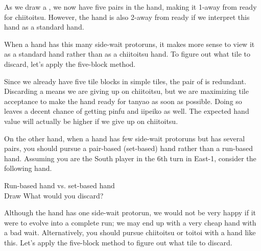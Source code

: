 \bigskip
\noindent As we draw a {\large{}}, we now have five pairs in the hand, making it 1-away from ready for {\jap chiitoitsu}. However, the hand is also 2-away from ready if we interpret this hand as a standard hand. 

\bigskip
When a hand has this many side-wait protoruns, it makes more sense to view it as a standard hand rather than as a {\jap chiitoitsu} hand. To figure out what tile to discard, let's apply the five-block method. 

\emj
Since we already have five tile blocks in simple tiles, the pair of {\large\bei} is redundant. Discarding a {\large\bei} means we are giving up on {\jap chiitoitsu}, but we are maximizing tile acceptance to make the hand ready for {\jap tanyao} as soon as possible. Doing so leaves a decent chance of getting {\jap pinfu} and {\jap iipeiko} as well. The expected hand value will actually be higher if we give up on {\jap chiitoitsu}.

\bigskip
On the other hand, when a hand has few side-wait protoruns but has several pairs, you should pursue a pair-based (set-based) hand rather than a run-based hand. Assuming you are the South player in the 6th turn in East-1, consider the following hand. 

\bigskip
\begin{itembox}[r]{Run-based hand vs. set-based hand}
\bp
{}\dong\nan\bai~\bai\\
\hspace{290pt}\footnotesize{Draw}
\ep
\vspace{-17pt}What would you discard? \vspace{-5pt}
\end{itembox}

\bigskip
\noindent Although the hand has one side-wait protorun, we would not be very happy if it were to evolve into a complete run; we may end up with a very cheap hand with a bad wait. Alternatively, you should pursue {\jap chiitoitsu} or {\jap toitoi} with a hand like this. Let's apply the five-block method to figure out what tile to discard.

